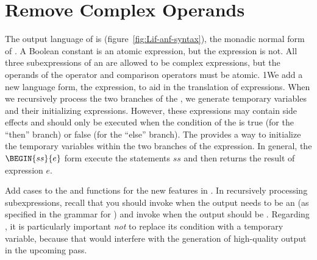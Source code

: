 \documentclass[7x10]{TimesAPriori_MIT}%
\def\pythonEd{1}
\def\edition{1}
\newcommand{\pythonColor}[0]{}
\newcommand{\python}[1]{{\if\edition\pythonEd\pythonColor #1\fi}}
\numberwithin{theorem}{chapter}
\numberwithin{definition}{chapter}
\numberwithin{equation}{chapter}
\begin{document}
\section{Remove Complex Operands}
\label{sec:remove-complex-opera-Lif}

The output language of  is
\LangIfANF{} (figure~\ref{fig:Lif-anf-syntax}), the monadic
normal form of \LangIf{}.  A Boolean constant is an atomic expression,
but the  expression is not.  All three subexpressions of an
 are allowed to be complex expressions, but the operands of
the  operator and comparison operators must be atomic.
%
\python{We add a new language form, the  expression, to aid
  in the translation of \code{if} expressions. When we recursively
  process the two branches of the \code{if}, we generate temporary
  variables and their initializing expressions. However, these
  expressions may contain side effects and should only be executed
  when the condition of the \code{if} is true (for the ``then''
  branch) or false (for the ``else'' branch). The \code{Begin} provides
  a way to initialize the temporary variables within the two branches
  of the \code{if} expression.  In general, the $\BEGIN{ss}{e}$
  form execute the statements $ss$ and then returns the result of
  expression $e$.}

Add cases to the  and  functions for
the new features in \LangIf{}. In recursively processing
subexpressions, recall that you should invoke  when
the output needs to be an \Atm{} (as specified in the grammar for
\LangIfANF{}) and invoke  when the output should be
\Exp{}.  Regarding , it is particularly important 
\emph{not} to replace its condition with a temporary variable, because
that would interfere with the generation of high-quality output in the
upcoming  pass.

\newcommand{\LifMonadASTRacket}{
\begin{array}{rcl}
\Atm &::=& \BOOL{\itm{bool}}\\
\Exp &::=& \UNIOP{\key{not}}{\Atm} 
     \MID \BINOP{\itm{cmp}}{\Atm}{\Atm} 
     \MID \IF{\Exp}{\Exp}{\Exp} 
\end{array}
}
  
\newcommand{\LifMonadASTPython}{
\begin{array}{rcl}
\Atm &::=& \BOOL{\itm{bool}}\\
\Exp &::=& \CMP{\Atm}{\itm{cmp}}{\Atm} \MID \IF{\Exp}{\Exp}{\Exp} \\
  &\MID& \BEGIN{\Stmt^{*}}{\Exp}\\
\Stmt{} &::=& \IFSTMT{\Exp}{\Stmt^{*}}{\Stmt^{*}}
\end{array}
}
\end{document}
